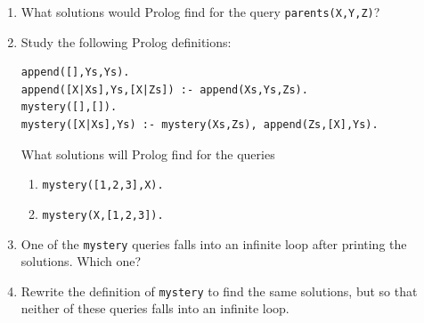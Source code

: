 \documentclass{article}
\begin{document}
\begin{enumerate}
\item 
What solutions would Prolog find for the query \verb!parents(X,Y,Z)!?

\item
Study the following Prolog definitions:
\begin{verbatim}
append([],Ys,Ys).
append([X|Xs],Ys,[X|Zs]) :- append(Xs,Ys,Zs).
mystery([],[]).
mystery([X|Xs],Ys) :- mystery(Xs,Zs), append(Zs,[X],Ys).
\end{verbatim}
What solutions will Prolog find for the queries
\begin{enumerate}
\item \verb!mystery([1,2,3],X).!
\item \verb!mystery(X,[1,2,3]).!
\end{enumerate}

\item
One of the \verb!mystery! queries falls into an infinite loop after
printing the solutions. Which one?


\item
Rewrite the definition of \verb!mystery! to find the same solutions,
but so that neither of these queries falls into an infinite loop.

\end{enumerate}
\end{document}
